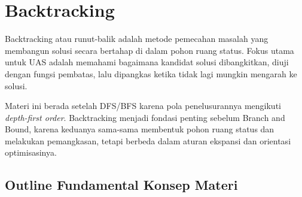 \section{Backtracking}

Backtracking atau runut-balik adalah metode pemecahan masalah yang membangun solusi secara bertahap di dalam pohon ruang status. Fokus utama untuk UAS adalah memahami bagaimana kandidat solusi dibangkitkan, diuji dengan fungsi pembatas, lalu dipangkas ketika tidak lagi mungkin mengarah ke solusi.

Materi ini berada setelah DFS/BFS karena pola penelusurannya mengikuti \textit{depth-first order}. Backtracking menjadi fondasi penting sebelum Branch and Bound, karena keduanya sama-sama membentuk pohon ruang status dan melakukan pemangkasan, tetapi berbeda dalam aturan ekspansi dan orientasi optimisasinya.

\subsection{Outline Fundamental Konsep Materi}

